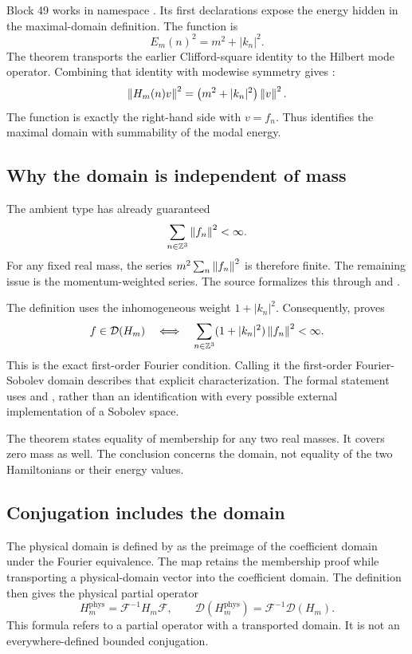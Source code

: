 Block 49 works in namespace . Its first declarations expose the energy hidden in the maximal-domain definition. The function  is
\[
 E_m(n)^2=m^2+|k_n|^2.
\]
The theorem  transports the earlier Clifford-square identity to the Hilbert mode operator. Combining that identity with modewise symmetry gives :
\[
 \left\lVert H_m(n)v\right\rVert^2
 =\bigl(m^2+|k_n|^2\bigr)\left\lVert v\right\rVert^2.
\]
The function  is exactly the right-hand side with \(v=f_n\). Thus  identifies the maximal domain with summability of the modal energy.

\subsection{Why the domain is independent of mass}

The ambient type has already guaranteed
\[
 \sum_{n\in\mathbb Z^3}\left\lVert f_n\right\rVert^2<\infty.
\]
For any fixed real mass, the series \(m^2\sum_n\left\lVert f_n\right\rVert^2\) is therefore finite. The remaining issue is the momentum-weighted series. The source formalizes this through  and .

The definition  uses the inhomogeneous weight \(1+|k_n|^2\). Consequently,  proves
\[
 f\in\mathcal D(H_m)
 \quad\Longleftrightarrow\quad
 \sum_{n\in\mathbb Z^3}(1+|k_n|^2)\left\lVert f_n\right\rVert^2<\infty.
\]
This is the exact first-order Fourier condition. Calling it the first-order Fourier-Sobolev domain describes that explicit characterization. The formal statement uses  and , rather than an identification with every possible external implementation of a Sobolev space.

The theorem  states equality of membership for any two real masses. It covers zero mass as well. The conclusion concerns the domain, not equality of the two Hamiltonians or their energy values.

\subsection{Conjugation includes the domain}

The physical domain is defined by  as the preimage of the coefficient domain under the Fourier equivalence. The map  retains the membership proof while transporting a physical-domain vector into the coefficient domain. The definition  then gives the physical partial operator
\[
 H_m^{\mathrm{phys}}=\mathcal F^{-1}H_m\mathcal F,
 \qquad
 \mathcal D(H_m^{\mathrm{phys}})
 =\mathcal F^{-1}\mathcal D(H_m).
\]
This formula refers to a partial operator with a transported domain. It is not an everywhere-defined bounded conjugation.

